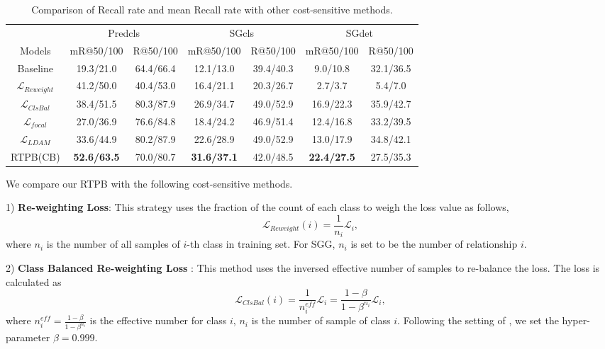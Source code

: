 \documentclass[letterpaper]{article} %
\begin{document}
\begin{table}[!ht]
    \centering
\begin{tabular}{c|cc|cc|cc}
\hline
                         & \multicolumn{2}{c|}{Predcls} & \multicolumn{2}{c|}{SGcls} & \multicolumn{2}{c}{SGdet} \\
Models                   & mR@50/100     & R@50/100     & mR@50/100    & R@50/100    & mR@50/100    & R@50/100    \\ \hline
Baseline                 & 19.3/21.0     & 64.4/66.4    & 12.1/13.0    & 39.4/40.3   & 9.0/10.8     & 32.1/36.5   \\
$\mathcal{L}_{Reweight}$ & 41.2/50.0     & 40.4/53.0    & 16.4/21.1    & 20.3/26.7   & 2.7/3.7      & 5.4/7.0     \\
$\mathcal{L}_{ClsBal}$   & 38.4/51.5     & 80.3/87.9    & 26.9/34.7    & 49.0/52.9   & 16.9/22.3    & 35.9/42.7   \\
$\mathcal{L}_{focal}$    & 27.0/36.9     & 76.6/84.8    & 18.4/24.2    & 46.9/51.4   & 12.4/16.8    & 33.2/39.5   \\
$\mathcal{L}_{LDAM}$     & 33.6/44.9     & 80.2/87.9    & 22.6/28.9    & 49.0/52.9   & 13.0/17.9    & 34.8/42.1   \\
RTPB(CB)                 & \textbf{52.6/63.5}     & 70.0/80.7    & \textbf{31.6/37.1}    & 42.0/48.5   & \textbf{22.4/27.5}    & 27.5/35.3   \\ \hline
\end{tabular}
	\caption{Comparison of Recall rate and mean Recall rate with other cost-sensitive methods.}
	\label{tab:debias_ng}
\end{table}
We compare our RTPB with the following cost-sensitive methods. 

1) \textbf{Re-weighting Loss}: This strategy uses the fraction of the count of each class to weigh the loss value as follows,
\begin{equation}
	\mathcal{L}_{Reweight}(i) = \frac{1}{n_i}\mathcal{L}_i, 
\end{equation}
where $n_i$ is the number of all samples of $i$-th class in training set. For SGG, $n_i$ is set to be the number of relationship $i$.


2) \textbf{Class Balanced Re-weighting Loss} \cite{cui2019class}: This method uses the inversed effective number of samples to re-balance the loss. The loss is calculated as
\begin{equation}
	\mathcal{L}_{ClsBal}(i) = \frac{1}{n_i^{eff}}\mathcal{L}_i = \frac{1-\beta}{1-\beta^{n_i}}\mathcal{L}_i,
\end{equation}
where $n_i^{eff} = \frac{1-\beta}{1-\beta^{n_i}}$ is the effective number for class $i$, $n_i$ is the number of sample of class $i$. Following the setting of  \cite{cui2019class}, we set the hyper-parameter $\beta= 0.999$. 
\end{document}
